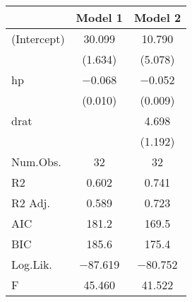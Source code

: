 \begin{table}
\centering
\begin{tabular}[t]{lcc}
\toprule
  & Model 1 & Model 2\\
\midrule
(Intercept) & \num{30.099} & \num{10.790}\\
 & (\num{1.634}) & (\num{5.078})\\
hp & \num{-0.068} & \num{-0.052}\\
 & (\num{0.010}) & (\num{0.009})\\
drat &  & \num{4.698}\\
 &  & (\num{1.192})\\
\midrule
Num.Obs. & \num{32} & \num{32}\\
R2 & \num{0.602} & \num{0.741}\\
R2 Adj. & \num{0.589} & \num{0.723}\\
AIC & \num{181.2} & \num{169.5}\\
BIC & \num{185.6} & \num{175.4}\\
Log.Lik. & \num{-87.619} & \num{-80.752}\\
F & \num{45.460} & \num{41.522}\\
\bottomrule
\end{tabular}
\end{table}

